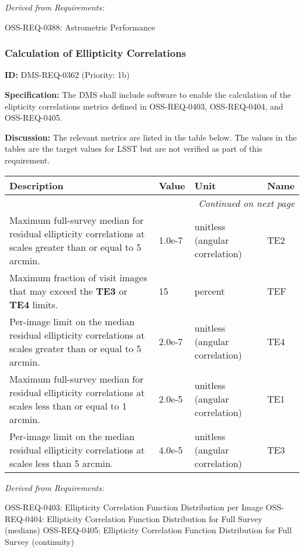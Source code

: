 \documentclass[SE,toc,lsstdraft]{lsstdoc}
\makeatletter
\newcommand{\paramname}[1]{\hspace{0pt}#1}
\newcommand{\unitname}[1]{\hspace{0pt}#1}
\newenvironment{parameters}[0]{%
\setlength\LTleft{0pt}
\setlength\LTright{\fill}
\begin{small}
\begin{longtable}[]{|p{0.49\textwidth}|l|p{0.6in}|p{1.70in}@{}|}

\hline \textbf{Description} & \textbf{Value} & \textbf{Unit} & \textbf{Name} \\ \hline
\endhead

\hline \multicolumn{4}{r}{\emph{Continued on next page}} \\
\endfoot

\hline\hline
\endlastfoot
}{%
\hline
\end{longtable}
\end{small}
}
\makeatother
\begin{document}
\emph{Derived from Requirements:}

OSS-REQ-0388:
Astrometric Performance \newline

\subsubsection{Calculation of Ellipticity Correlations}

\label{DMS-REQ-0362}
\textbf{ID:} DMS-REQ-0362 (Priority: 1b)

\textbf{Specification:}
The DMS shall include software to enable the calculation of the elipticity correlations metrics defined in OSS-REQ-0403, OSS-REQ-0404, and OSS-REQ-0405.

\textbf{Discussion:}
The relevant metrics are listed in the table below. The values in the tables are the target values for LSST but are not verified as part of this requirement.

\begin{parameters}
Maximum full-survey median for residual ellipticity correlations at scales greater than or equal to 5 arcmin.
&
1.0e-7
&
\unitname{%
unitless (angular correlation)
}
&
\paramname{%
TE2
} \\\hline
Maximum fraction of visit images that may exceed the \textbf{TE3} or \textbf{TE4} limits.
&
15
&
\unitname{%
percent
}
&
\paramname{%
TEF
} \\\hline
Per-image limit on the median residual ellipticity correlations at scales greater than or equal to 5 arcmin.
&
2.0e-7
&
\unitname{%
unitless (angular correlation)
}
&
\paramname{%
TE4
} \\\hline
Maximum full-survey median for residual ellipticity correlations at scales less than or equal to 1 arcmin.
&
2.0e-5
&
\unitname{%
unitless (angular correlation)
}
&
\paramname{%
TE1
} \\\hline
Per-image limit on the median residual ellipticity correlations at scales less than 5 arcmin.
&
4.0e-5
&
\unitname{%
unitless (angular correlation)
}
&
\paramname{%
TE3
} \\\hline
\end{parameters}

\emph{Derived from Requirements:}

OSS-REQ-0403:
Ellipticity Correlation Function Distribution per Image \newline
OSS-REQ-0404:
Ellipticity Correlation Function Distribution for Full Survey (medians) \newline
OSS-REQ-0405:
Ellipticity Correlation Function Distribution for Full Survey (continuity) \newline
\end{document}
